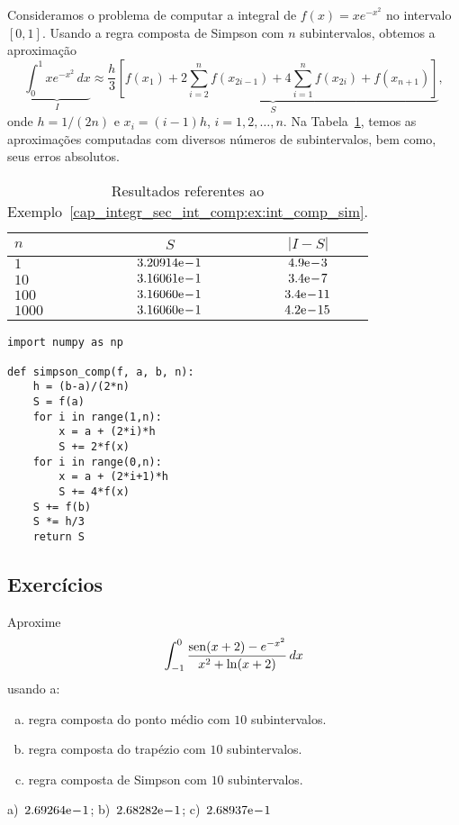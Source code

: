 \begin{ex}\label{cap_integr_sec_int_comp:ex:int_comp_sim}
  Consideramos o problema de computar a integral de $f(x)=xe^{-x^2}$ no intervalo $[0, 1]$. Usando a regra composta de Simpson com $n$ subintervalos, obtemos a aproximação
  \begin{equation}
    \underbrace{\int_0^1 xe^{-x^2}\,dx}_{I} \approx \underbrace{\frac{h}{3}\left[f(x_1) + 2\sum_{i=2}^{n} f(x_{2i-1}) + 4\sum_{i=1}^{n} f(x_{2i}) + f(x_{n+1})\right]}_{S},
  \end{equation}
onde $h=1/(2n)$ e $x_i = (i-1)h$, $i=1, 2, \dotsc, n$. Na Tabela~\ref{cap_integr_sec_int_comp:tab:ex_int_comp_sim}, temos as aproximações computadas com diversos números de subintervalos, bem como, seus erros absolutos.

\begin{table}[H]
  \centering
  \caption{Resultados referentes ao Exemplo~\ref{cap_integr_sec_int_comp:ex:int_comp_sim}.}
  \begin{tabular}{l|cc}\toprule
    $n$ & $S$ & $|I-S|$ \\\midrule
    $1$    & $3.20914\mathrm{e}\!-\!1$ & $4.9\mathrm{e}\!-\!3$ \\
    $10$   & $3.16061\mathrm{e}\!-\!1$ & $3.4\mathrm{e}\!-\!7$ \\
    $100$  & $3.16060\mathrm{e}\!-\!1$ & $3.4\mathrm{e}\!-\!11$ \\
    $1000$ & $3.16060\mathrm{e}\!-\!1$ & $4.2\mathrm{e}\!-\!15$ \\\bottomrule
  \end{tabular}
  \label{cap_integr_sec_int_comp:tab:ex_int_comp_sim}
\end{table}

\begin{lstlisting}[caption=simpson\_comp.py]
import numpy as np

def simpson_comp(f, a, b, n):
    h = (b-a)/(2*n)
    S = f(a)
    for i in range(1,n):
        x = a + (2*i)*h
        S += 2*f(x)
    for i in range(0,n):
        x = a + (2*i+1)*h
        S += 4*f(x)  
    S += f(b)
    S *= h/3
    return S
\end{lstlisting}
\end{ex}

\subsection*{Exercícios}

\begin{exer}
  Aproxime
  \begin{equation}
    \int_{-1}^0 \frac{\operatorname{sen}(x+2)-e^{-x^2}}{x^2+\ln(x+2)}\,dx
  \end{equation}
  usando a:
  \begin{enumerate}[a)]
  \item regra composta do ponto médio com $10$ subintervalos.
  \item regra composta do trapézio com $10$ subintervalos.
  \item regra composta de Simpson com $10$ subintervalos.
  \end{enumerate}
\end{exer}
\begin{resp}
  a)~$2.69264\mathrm{e}\!-\!1$; b)~$2.68282\mathrm{e}\!-\!1$; c)~$2.68937\mathrm{e}\!-\!1$
\end{resp}

